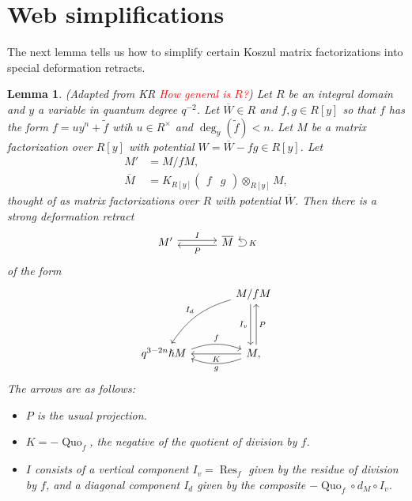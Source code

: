 \documentclass{article}
\DeclareMathOperator{\Res}{Res}
\DeclareMathOperator{\Quo}{Quo}
\newcommand{\sdr}[5]{%
  \begin{tikzcd}[column sep=large, ampersand replacement=\&]
    {#1} \arrow[r, "#3", shift left=0.5ex,] \arrow[r, leftarrow, "#4", shift right=0.5ex, swap] \& 
    {#2} \arrow[loop right, distance=1em, in=15, out=-15, "#5",swap]
  \end{tikzcd}%
}
\newcommand{\kmf}[2]{
	K_{#1}{\begin{pmatrix}
			#2
		\end{pmatrix}
	}	
}
\theoremstyle{plain} %
\newtheorem{lemma}[theorem]{Lemma}
\theoremstyle{definition} %
\theoremstyle{remark} %
\begin{document}
\section{Web simplifications}
The next lemma tells us how to simplify certain Koszul matrix factorizations into special deformation retracts.

\begin{lemma}\label{sdrlemma}    (Adapted from KR \textcolor{red}{How general is $R$?}) Let $R$ be an integral domain and $y$ a variable in quantum degree $q^{-2}$. Let $\overline W\in R$ and $f,g\in R[y]$ so that $f$ has the form $f=uy^n+\tilde f$ wtih $u\in R^\times$ and $\deg_y(\tilde f)<n$. Let $M$ be a matrix factorization over $R[y]$ with potential $W=\overline W-fg\in R[y]$. Let 
\begin{align*}
	M'
	&
	=M/fM
	,
	\\
	\overline M 
	&
	= 
	\kmf{R[y]}{f & g}\otimes_{R[y]} M
	,
\end{align*}
thought of as matrix factorizations over $R$ with potential $\overline W$.
Then there is a strong deformation retract
$$
	\sdr{M'}{\overline M}{I}{P}{K}
$$
of the form
$$
	\begin{tikzcd}[column sep=large, ]
		&
		M/fM
		\ar[dd, shift right=0.6ex, "I_v", swap]
		\ar[dd, leftarrow, shift left=0.6ex, "P"]
		\arrow[ddl, "I_d", bend right=20, swap]
		\\
		\\
		q^{3-2n}\hslash M
		\arrow[r, "f", shift left=1ex, bend left=20, start anchor=east, end anchor=west]
		& 
		M\ar[l, "K"]
		\arrow[l, "g", shift left=1ex, bend left=20, start anchor=west, end anchor=east], 
	\end{tikzcd}
$$
	The arrows are as follows:
	\begin{itemize}
		\item $P$ is the usual projection.
		\item $K=-\Quo_f$, the negative of the quotient of division by $f$.
		\item $I$ consists of a vertical component $I_v=\Res_f$ given by the residue of division by $f$, and a diagonal component $I_d$ given by the composite $-\Quo_f\circ d_{M}\circ I_v$.
	\end{itemize}
\end{lemma}
\end{document}
